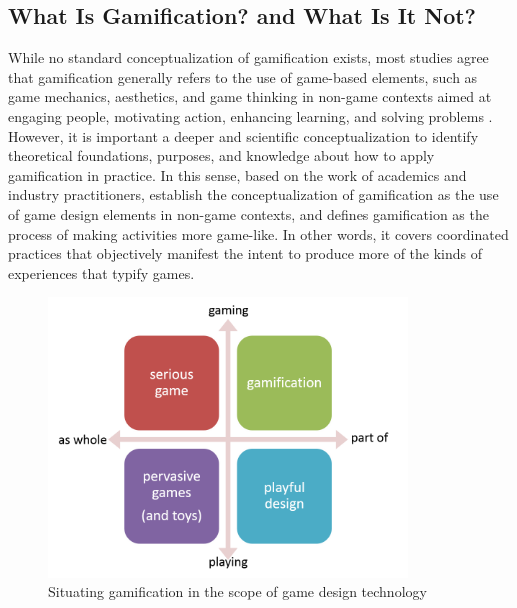 \subsection{What Is Gamification? and What Is It Not?}

While no standard conceptualization of gamification exists, most studies agree that gamification generally refers to the use of game-based elements, such as game mechanics, aesthetics, and game thinking in non-game contexts aimed at engaging people, motivating action, enhancing learning, and solving problems \cite{BorgesDurelliReisIsotani2014,  Kapp2012}. However, it is important a deeper and scientific conceptualization to identify theoretical foundations, purposes, and knowledge about how to apply gamification in practice. In this sense, based on the work of academics and industry practitioners,  establish the conceptualization of gamification as the use of game design elements in non-game contexts, and  defines gamification as the process of making activities more game-like.
In other words, it covers coordinated practices that objectively manifest the intent to produce more of the kinds of experiences that typify games.

\begin{figure}[htb]
 \caption{Situating gamification in the scope of game design technology}
 \label{fig:game-design-technology}
 \centering
 \includegraphics[width=0.85\textwidth]{images/chap-general-background/game-design-technology.png}
\end{figure}


